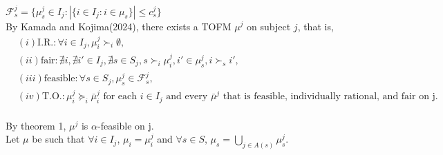 \documentclass[a4j,10pt]{jsarticle}
\theoremstyle{definition}
\theoremstyle{remark}
\theoremstyle{plain}
\begin{document}
$\mathcal{F}^j_s =\{ \mu^j_s \in I_j :  |\{i \in I_j : i \in \mu_s\}| \leq c^j_s \}$\\
By Kamada and Kojima(2024), there exists a TOFM $\mu^j$ on subject $j$, that is,
\begin{align*}
  &(i) \text{I.R.}: \forall i \in I_j, \mu^j_i \succ_i \emptyset,\\
  &(ii) \text{fair}:  \nexists i,\nexists i' \in I_j, \nexists s \in S_j, s \succ_i \mu^j_i, i' \in \mu^j_s, i \succ_s i',\\
  &(iii) \text{feasible}:  \forall s \in S_j, \mu^j_s \in \mathcal{F}^j_s,\\
  &(iv) \text{T.O.}:  \mu^j_i \succeq_i \bar{\mu}^j_i \text{ for each } i \in I_j \text{ and every } \bar{\mu}^j \text{ that is feasible, individually rational, and fair on j.}
\end{align*}\\
By theorem 1, $\mu^j$ is $\alpha$-feasible on j.\\
Let $\mu$ be such that $\forall i \in I_j$, $\mu_i=\mu^j_i$ and $\forall s \in S$, $\mu_s = \bigcup\limits_{j \in A(s)} \mu^j_s$.\\
\end{document}
